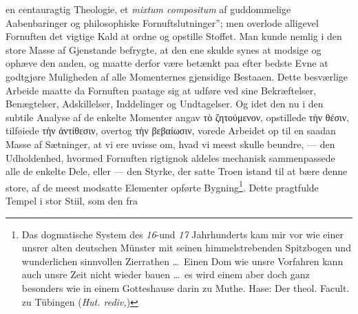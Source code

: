 \documentclass[12pt]{book}
\newcommand{\opage}[1]{\marginnote{\footnotesize\textit{[#1]}}}
\begin{document}
en centauragtig Theologie, et \textit{mixtum compositum} af guddommelige
Aabenbaringer og philosophiske Fornuftslutninger”; men overlode alligevel
Fornuften det vigtige Kald at ordne og opstille Stoffet. Man kunde nemlig i
den store Masse af Gjenstande befrygte, at den ene skulde synes at modsige og
ophæve den anden, og maatte derfor være betænkt paa efter bedste Evne at
godtgjøre Muligheden af alle Momenternes gjensidige Bestaaen.
\opage{82} \setcounter{footnote}{0}%
Dette besværlige Arbeide maatte da Fornuften paatage sig at udføre ved sine
Bekræftelser, Benægtelser, Adskillelser, Inddelinger og Undtagelser. Og idet
den nu i den subtile Analyse af de enkelte Momenter angav τὸ ζητούμενον,
opstillede τὴν θέσιν, tilføiede τὴν ἀντίθεσιν, overtog τὴν βεβαίωσιν, vorede
Arbeidet op til en saadan Masse af Sætninger, at vi ere uvisse om, hvad vi
meest skulle beundre, --- den Udholdenhed, hvormed Fornuften rigtignok
aldeles mechanisk sammenpassede alle de enkelte Dele, eller --- den Styrke,
der satte Troen istand til at bære denne store, af de meest modsatte
Elementer opførte Bygning\footnote{Das dogmatische System des \textit{16}-und
\textit{17} Jahrhunderts kam mir vor wie einer unsrer alten deutschen Münster
mit seinen himmelstrebenden Spitzbogen und wunderlichen sinnvollen
Zierrathen \ldots\ Einen Dom wie unsre Vorfahren kann auch unsre Zeit nicht
wieder bauen \ldots\ es wird einem aber doch ganz besonders wie in einem
Gotteshause darin zu Muthe. Hase: Der theol. Facult. zu Tübingen
(\textit{Hut. rediv,})}. Dette pragtfulde Tempel i stor Stiil, som den fra
\end{document}
